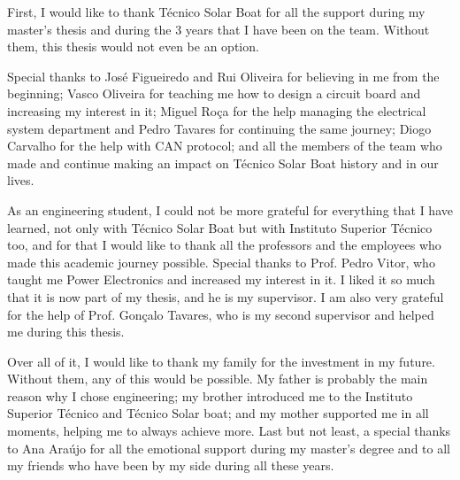 \documentclass[defaultstyle,10pt,Helvetica]{istulthesis}
\begin{document}
\begin{acknowledgments}
	First, I would like to thank Técnico Solar Boat for all the support during my master's thesis and during the 3 years that I have been on the team. Without them, this thesis would not even be an option. 
	
	Special thanks to José Figueiredo and Rui Oliveira for believing in me from the beginning; Vasco Oliveira for teaching me how to design a circuit board and increasing my interest in it; Miguel Roça for the help managing the electrical system department and Pedro Tavares for continuing the same journey; Diogo Carvalho for the help with CAN protocol; and all the members of the team who made and continue making an impact on Técnico Solar Boat history and in our lives.

	As an engineering student, I could not be more grateful for everything that I have learned, not only with Técnico Solar Boat but with Instituto Superior Técnico too, and for that I would like to thank all the professors and the employees who made this academic journey possible. Special thanks to Prof. Pedro Vitor, who taught me Power Electronics and increased my interest in it. I liked it so much that it is now part of my thesis, and he is my supervisor. I am also very grateful for the help of Prof. Gonçalo Tavares, who is my second supervisor and helped me during this thesis.

	Over all of it, I would like to thank my family for the investment in my future. Without them, any of this would be possible. My father is probably the main reason why I chose engineering; my brother introduced me to the Instituto Superior Técnico and Técnico Solar boat; and my mother supported me in all moments, helping me to always achieve more. Last but not least, a special thanks to Ana Araújo for all the emotional support during my master's degree and to all my friends who have been by my side during all these years.

\end{acknowledgments}

\setcounter{page}{1} 
\baselineskip 18pt %
\begin{abstract}
	
\end{abstract}
\begin{keywords}
  
\end{keywords}
\clearpage
\thispagestyle{empty}
\end{document}
